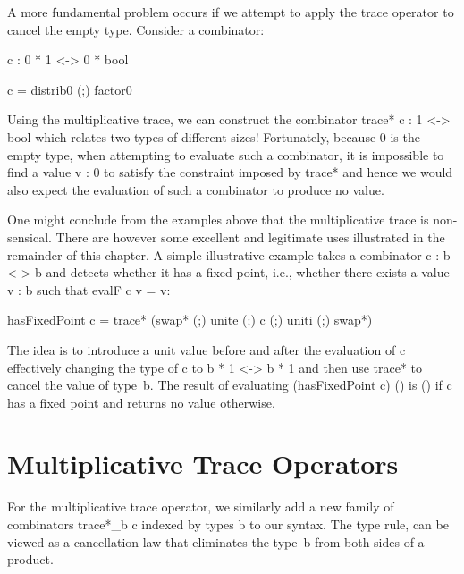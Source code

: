\documentclass{llncs}
\begin{document}
\begin{example}
A more fundamental problem occurs if we attempt to apply the trace
operator to cancel the empty type. Consider a combinator:

{{c : 0 * 1 <-> 0 * bool}}

{{c = distrib0 (;) factor0}}

\noindent Using the multiplicative trace, we can construct the combinator
{{trace* c : 1 <-> bool}} which relates two types of different sizes! Fortunately,
because {{0}} is the empty type, 
when attempting to evaluate such a combinator, it is impossible to find a value
{{v : 0}} to satisfy the constraint imposed by {{trace*}} and hence 
we would also expect the evaluation of such a combinator to produce no value.
\end{example}

\begin{example}
One might conclude from the examples above that the multiplicative
trace is non-sensical. There are however some excellent and legitimate
uses illustrated in the remainder of this chapter. A simple
illustrative example takes a combinator {{c : b <-> b}} and detects
whether it has a fixed point, i.e., whether there exists a value 
{{v :  b}} such that {{evalF c v = v}}:

{{hasFixedPoint c = trace* (swap* (;) unite (;) c (;) uniti (;) swap*)}}

\noindent The idea is to introduce a unit value before and after the evaluation of {{c}}
effectively changing the type of {{c}} to {{b * 1 <-> b * 1}}
and then use {{trace*}} to
cancel the value of type~{{b}}. The result of evaluating
{{(hasFixedPoint c) ()}} is {{()}} if {{c}} has a fixed point and returns 
no value otherwise. 
\end{example}

\section{Multiplicative Trace Operators}
\label{sec:trace}

For the multiplicative trace operator, we similarly add a new family
of combinators {{trace*_{b} c}} indexed by types {{b}} to our
syntax. The type rule, can be viewed as a cancellation law that
eliminates the type~{{b}} from both sides of a product.

\begin{definition}
\end{definition}
\end{document}
